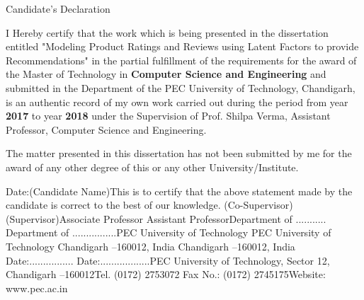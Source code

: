 \documentclass{article}
\begin{document}
\justify

\begin{center}
Candidate's Declaration
\end{center}
I Hereby  certify  that  the  work  which  is  being  presented  in  the dissertation entitled "Modeling Product Ratings and Reviews using Latent Factors to provide Recommendations" in  the partial fulfillment of the requirements for the award of the Master of Technology in \textbf{Computer Science and Engineering} and submitted in the Department of the PEC University of Technology, Chandigarh, is  an  authentic record of my own work carried out during the period from year \textbf{2017} to year \textbf{2018} under the Supervision of Prof. Shilpa Verma, Assistant Professor, Computer Science and Engineering. 

The  matter  presented  in  this dissertation has  not  been  submitted  by  me  for  the  award  of  any other degree of this or any other University/Institute.

Date:(Candidate Name)This  is  to  certify  that  the  above  statement  made  by  the  candidate  is  correct  to  the  best  of  our knowledge. (Co-Supervisor)(Supervisor)Associate Professor                                                         Assistant ProfessorDepartment of ...........                   Department of ................PEC University of Technology                                        PEC University of Technology                                                        Chandigarh –160012, India                                            Chandigarh –160012, India                                                                                                   Date:................                                                           Date:..................PEC University of Technology, Sector 12, Chandigarh –160012Tel. (0172) 2753072 Fax No.: (0172) 2745175Website: www.pec.ac.in
\end{document}
